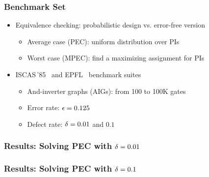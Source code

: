 \begin{frame}
    \frametitle{Benchmark Set}
    \begin{itemize}
        \item Equivalence checking: probabilistic design vs. error-free version
              \pause
              \begin{itemize}
                  \item Average case (PEC): uniform distribution over PIs
                        \pause
                  \item Worst case (MPEC): find a maximizing assignment for PIs
                        \pause
              \end{itemize}
        \item ISCAS\,'85~\cite{ISCAS85-benchmark}
              and EPFL~\cite{EPFL-benchmark} benchmark suites
              \pause
              \begin{itemize}
                  \item And-inverter graphs (AIGs): from 100 to 100K gates
                        \pause
                  \item Error rate: $\epsilon=0.125$
                        \pause
                  \item Defect rate: $\delta=0.01$ and $0.1$
              \end{itemize}
    \end{itemize}
\end{frame}

\begin{frame}
    \frametitle{Results: Solving PEC with $\delta=0.01$}
    \begin{table}
        \centering
        \tiny
    \end{table}
\end{frame}

\begin{frame}
    \frametitle{Results: Solving PEC with $\delta=0.1$}
    \begin{table}
        \centering
        \tiny
    \end{table}
\end{frame}

